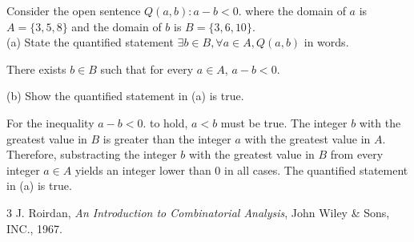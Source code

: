 \documentclass[12pt]{article}
\newenvironment{problem}[2][Problem]{\begin{trivlist}
		\item[\hskip \labelsep {\bfseries #1}\hskip \labelsep {\bfseries #2.}]}{\end{trivlist}}
\newenvironment{solution}[2][Solution]{\begin{trivlist}
		\item[\hskip \labelsep {\bfseries #1}\hskip \labelsep {\bfseries #2.}]}{\end{trivlist}}
\begin{document}
\begin{problem}{79}
	Consider the open sentence $Q(a,b):a-b<0.$ where the domain of $a$ is $A = \{3,5,8\}$ and the domain of $b$ is $B = \{3,6,10\}$.\\
	
	(a) State the quantified statement $\exists b \in B, \forall a \in A, Q(a,b)$ in words.
	\begin{solution}{a}
	There exists $b \in B$ such that for every $a \in A$, $a-b < 0$.
	\end{solution}  

	(b) Show the quantified statement in (a) is true.
	\begin{solution}{b}
		For the inequality $a-b < 0.$ to hold, $a<b$ must be true. The integer $b$ with the greatest value in $B$ is greater than the integer $a$ with the greatest value in $A$. Therefore, substracting the integer $b$ with the greatest value in $B$ from every integer $a \in A$   yields an integer lower than 0 in all cases. The quantified statement in (a) is true.
	\end{solution}
\end{problem}
\begin{thebibliography}{3}
	J. Roirdan, 
	\textit{An Introduction to Combinatorial Analysis}, John Wiley \& Sons, INC., 1967.
\end{thebibliography}
\end{document}

